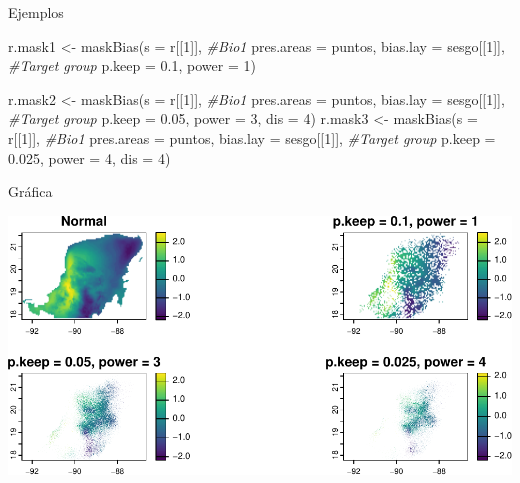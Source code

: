 \documentclass[
  11pt,
  ignorenonframetext,
]{beamer}
\newenvironment{Shaded}{}{}
\newcommand{\AttributeTok}[1]{\textcolor[rgb]{0.49,0.56,0.16}{#1}}
\newcommand{\CommentTok}[1]{\textcolor[rgb]{0.38,0.63,0.69}{\textit{#1}}}
\newcommand{\DecValTok}[1]{\textcolor[rgb]{0.25,0.63,0.44}{#1}}
\newcommand{\FloatTok}[1]{\textcolor[rgb]{0.25,0.63,0.44}{#1}}
\newcommand{\FunctionTok}[1]{\textcolor[rgb]{0.02,0.16,0.49}{#1}}
\newcommand{\NormalTok}[1]{#1}
\newcommand{\OtherTok}[1]{\textcolor[rgb]{0.00,0.44,0.13}{#1}}
\begin{document}
\begin{frame}[fragile]{Ejemplos}
\protect\hypertarget{ejemplos}{}
\begin{Shaded}
\begin{Highlighting}[]
\NormalTok{r.mask1 }\OtherTok{\textless{}{-}} \FunctionTok{maskBias}\NormalTok{(}\AttributeTok{s =}\NormalTok{ r[[}\DecValTok{1}\NormalTok{]], }\CommentTok{\#Bio1}
                   \AttributeTok{pres.areas =}\NormalTok{ puntos, }
                   \AttributeTok{bias.lay =}\NormalTok{ sesgo[[}\DecValTok{1}\NormalTok{]], }\CommentTok{\#Target group}
                   \AttributeTok{p.keep =} \FloatTok{0.1}\NormalTok{, }\AttributeTok{power =} \DecValTok{1}\NormalTok{)}

\NormalTok{r.mask2 }\OtherTok{\textless{}{-}} \FunctionTok{maskBias}\NormalTok{(}\AttributeTok{s =}\NormalTok{ r[[}\DecValTok{1}\NormalTok{]], }\CommentTok{\#Bio1}
                   \AttributeTok{pres.areas =}\NormalTok{ puntos, }
                   \AttributeTok{bias.lay =}\NormalTok{ sesgo[[}\DecValTok{1}\NormalTok{]], }\CommentTok{\#Target group}
                   \AttributeTok{p.keep =} \FloatTok{0.05}\NormalTok{, }\AttributeTok{power =} \DecValTok{3}\NormalTok{, }\AttributeTok{dis =} \DecValTok{4}\NormalTok{)}
\NormalTok{r.mask3 }\OtherTok{\textless{}{-}} \FunctionTok{maskBias}\NormalTok{(}\AttributeTok{s =}\NormalTok{ r[[}\DecValTok{1}\NormalTok{]], }\CommentTok{\#Bio1}
                   \AttributeTok{pres.areas =}\NormalTok{ puntos, }
                   \AttributeTok{bias.lay =}\NormalTok{ sesgo[[}\DecValTok{1}\NormalTok{]], }\CommentTok{\#Target group}
                   \AttributeTok{p.keep =} \FloatTok{0.025}\NormalTok{, }\AttributeTok{power =} \DecValTok{4}\NormalTok{, }\AttributeTok{dis =} \DecValTok{4}\NormalTok{)}
\end{Highlighting}
\end{Shaded}
\end{frame}

\begin{frame}{Gráfica}
\protect\hypertarget{gruxe1fica-1}{}
\begin{center}\includegraphics{Tutorial-spatstat-2_files/figure-beamer/unnamed-chunk-24-1} \end{center}
\end{frame}
\end{document}
